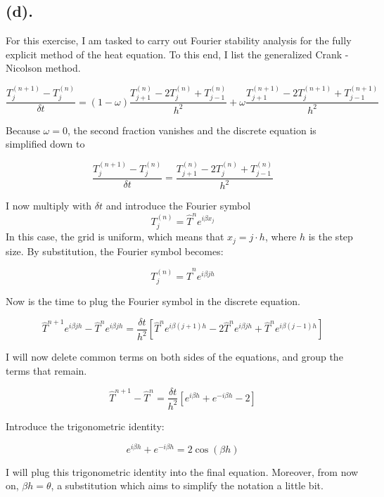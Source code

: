 
\subsection{(d).}
For this exercise, I am tasked to carry out Fourier stability analysis for the fully explicit method of the heat equation. To this end, I list the generalized Crank - Nicolson method.

\[
	\frac{T_{j}^{(n+1)} - T_{j}^{(n)}}{\delta t} = (1 - \omega) \frac{T_{j+1}^{(n)} - 2 T_{j}^{(n)} + T_{j-1}^{(n)}}{h^2} + \omega \frac{T_{j+1}^{(n+1)} - 2 T_{j}^{(n+1)} + T_{j-1}^{(n+1)}}{h^2}
\]

Because \( \omega = 0 \), the second fraction vanishes and the discrete equation is simplified down to

\[
	\frac{T_{j}^{(n+1)} - T_{j}^{(n)}}{\delta t} = \frac{T_{j+1}^{(n)} - 2 T_{j}^{(n)} + T_{j-1}^{(n)}}{h^2}
\]

I now multiply with \( \delta t \) and introduce the Fourier symbol
\[
	T_{j}^{(n)} = \hat{T}^{n} e^{i \beta x_{j}}
\]
In this case, the grid is uniform, which means that \( x_{j} = j \cdot h \), where \( h \) is the step size. By substitution, the Fourier symbol becomes:

\[
	T_j^{(n)} = \hat{T}^n e^{i \beta j h} 
\]

Now is the time to plug the Fourier symbol in the discrete equation.

\[
	\hat{T}^{n+1} e^{i \beta j h} - \hat{T}^{n} e^{i \beta j h} = \frac{\delta t}{h^2} \left[ \hat{T}^n e^{i \beta (j+1) h} - 2 \hat{T}^{n} e^{i \beta j h} + \hat{T}^n e^{i \beta (j-1) h} \right]
\]

I will now delete common terms on both sides of the equations, and group the terms that remain.

\[
	\hat{T}^{n+1} - \hat{T}^n = \frac{\delta t}{h^2} \left[ e^{i \beta h} + e^{-i \beta h} -2  \right]
\]

Introduce the trigonometric identity:

\begin{equation} \label{eq: trigonometry}
	e^{i \beta h} + e^{-i \beta h} = 2 \cos{(\beta h)} 
\end{equation}

I will plug this trigonometric identity into the final equation. Moreover, from now on, \( \beta h = \theta \), a substitution which aims to simplify the notation a little bit.

